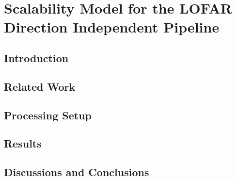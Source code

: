 \chapter{Scalability Model for the LOFAR Direction Independent Pipeline}\label{ch:Scalability_model}

\begin{abstract}


\end{abstract}

\section{\label{sec:ch6_intro}Introduction }


\section{Related Work}\label{sec:ch6_related}


\section{Processing Setup }\label{sec:ch6_methods}



\section{Results}\label{sec:ch6_results}


\section{Discussions and Conclusions}\label{sec:ch6_discussions}



